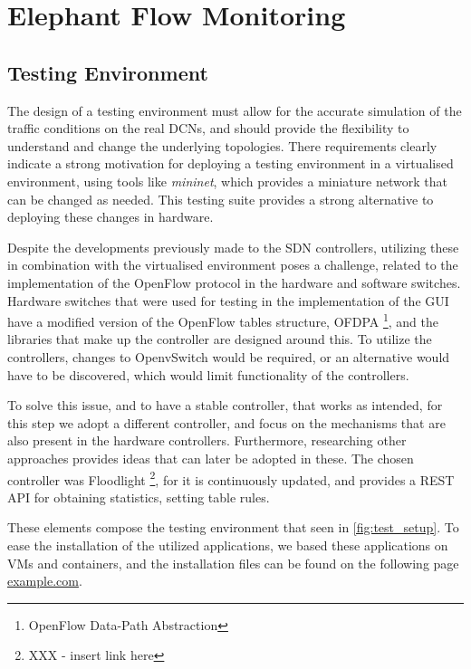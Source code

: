 \chapter{Elephant Flow Monitoring} \label{chap:me} 

\section {Testing Environment}

The design of a testing environment must allow for the accurate simulation of the traffic conditions on the real DCNs, and should provide the flexibility to 
understand and change the underlying topologies. There requirements clearly indicate a strong motivation for deploying a testing environment in a virtualised
environment, using tools like \textit{mininet}, which provides a miniature network that can be changed as needed. This testing suite provides a strong 
alternative to deploying these changes in hardware.

\par Despite the developments previously made to the SDN controllers, utilizing these in combination with the virtualised environment poses a challenge, related 
to the implementation of the OpenFlow protocol in the hardware and software switches. Hardware switches that were used for testing in the implementation of
the GUI have a modified version of the OpenFlow tables structure, OFDPA \footnote{OpenFlow Data-Path Abstraction}, and the libraries that make up the 
controller are designed around this. To utilize the controllers, changes to OpenvSwitch would be required, or an alternative would have to be 
discovered, which would limit functionality of the controllers.

\par To solve this issue, and to have a stable controller, that works as intended, for this step we adopt a different controller, and focus on the mechanisms that 
are also present in the hardware controllers. Furthermore, researching other approaches provides ideas that can later be adopted in these. The chosen controller
was Floodlight \footnote { XXX - insert link here}, for it is continuously updated, and provides a REST API for obtaining statistics, setting table rules.

\par These elements compose the testing environment that seen in \ref{fig:test_setup}. To ease the installation of the utilized applications, 
we based these applications on VMs and containers, and the installation files can be found on the following page \url {example.com}.

